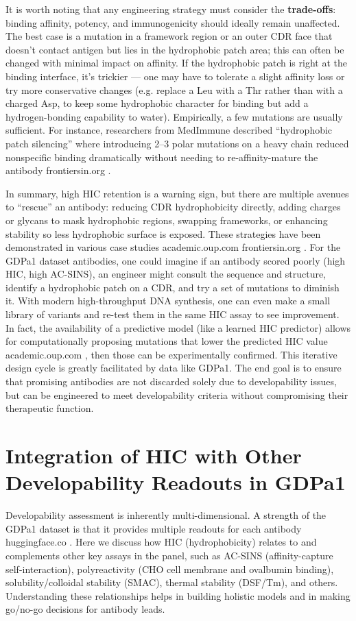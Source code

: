 \documentclass[12pt]{article}
\begin{document}
It is worth noting that any engineering strategy must consider the \textbf{trade-offs}: binding affinity, potency, and immunogenicity should ideally remain unaffected. The best case is a mutation in a framework region or an outer CDR face that doesn’t contact antigen but lies in the hydrophobic patch area; this can often be changed with minimal impact on affinity. If the hydrophobic patch is right at the binding interface, it’s trickier — one may have to tolerate a slight affinity loss or try more conservative changes (e.g. replace a Leu with a Thr rather than with a charged Asp, to keep some hydrophobic character for binding but add a hydrogen-bonding capability to water). Empirically, a few mutations are usually sufficient. For instance, researchers from MedImmune described “hydrophobic patch silencing” where introducing 2–3 polar mutations on a heavy chain reduced nonspecific binding dramatically without needing to re-affinity-mature the antibody
frontiersin.org
.

In summary, high HIC retention is a warning sign, but there are multiple avenues to “rescue” an antibody: reducing CDR hydrophobicity directly, adding charges or glycans to mask hydrophobic regions, swapping frameworks, or enhancing stability so less hydrophobic surface is exposed. These strategies have been demonstrated in various case studies
academic.oup.com
frontiersin.org
. For the GDPa1 dataset antibodies, one could imagine if an antibody scored poorly (high HIC, high AC-SINS), an engineer might consult the sequence and structure, identify a hydrophobic patch on a CDR, and try a set of mutations to diminish it. With modern high-throughput DNA synthesis, one can even make a small library of variants and re-test them in the same HIC assay to see improvement. In fact, the availability of a predictive model (like a learned HIC predictor) allows for computationally proposing mutations that lower the predicted HIC value
academic.oup.com
, then those can be experimentally confirmed. This iterative design cycle is greatly facilitated by data like GDPa1. The end goal is to ensure that promising antibodies are not discarded solely due to developability issues, but can be engineered to meet developability criteria without compromising their therapeutic function.

\section{Integration of HIC with Other Developability Readouts in GDPa1}
Developability assessment is inherently multi-dimensional. A strength of the GDPa1 dataset is that it provides multiple readouts for each antibody
huggingface.co
. Here we discuss how HIC (hydrophobicity) relates to and complements other key assays in the panel, such as AC-SINS (affinity-capture self-interaction), polyreactivity (CHO cell membrane and ovalbumin binding), solubility/colloidal stability (SMAC), thermal stability (DSF/Tm), and others. Understanding these relationships helps in building holistic models and in making go/no-go decisions for antibody leads.
\end{document}
